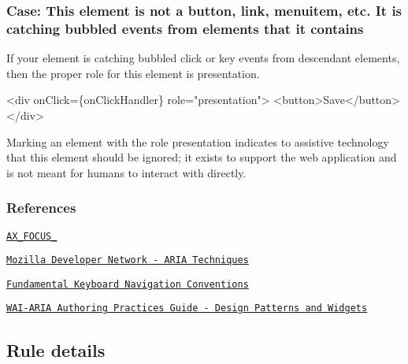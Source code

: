 \subsubsection*{Case\+: This element is not a button, link, menuitem, etc. It is catching bubbled events from elements that it contains}

If your element is catching bubbled click or key events from descendant elements, then the proper role for this element is {\ttfamily presentation}.


\begin{DoxyCode}
<div
  onClick=\{onClickHandler\}
  role="presentation">
  <button>Save</button>
</div>
\end{DoxyCode}


Marking an element with the role {\ttfamily presentation} indicates to assistive technology that this element should be ignored; it exists to support the web application and is not meant for humans to interact with directly.

\subsubsection*{References}


\begin{DoxyEnumerate}
\item \href{https://github.com/GoogleChrome/accessibility-developer-tools/wiki/Audit-Rules#ax_focus_02}{\tt A\+X\+\_\+\+F\+O\+C\+U\+S\+\_}
\end{DoxyEnumerate}
\begin{DoxyEnumerate}
\item \href{https://developer.mozilla.org/en-US/docs/Web/Accessibility/ARIA/ARIA_Techniques/Using_the_button_role#Keyboard_and_focus}{\tt Mozilla Developer Network -\/ A\+R\+IA Techniques}
\end{DoxyEnumerate}
\begin{DoxyEnumerate}
\item \href{https://www.w3.org/TR/wai-aria-practices-1.1/#kbd_generalnav}{\tt Fundamental Keyboard Navigation Conventions}
\end{DoxyEnumerate}
\begin{DoxyEnumerate}
\item \href{https://www.w3.org/TR/wai-aria-practices-1.1/#aria_ex}{\tt W\+A\+I-\/\+A\+R\+IA Authoring Practices Guide -\/ Design Patterns and Widgets}
\end{DoxyEnumerate}

\subsection*{Rule details}

